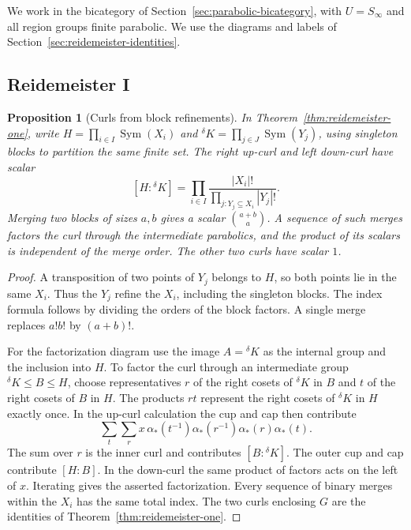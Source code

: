 \documentclass[11pt,a4paper]{article}
\numberwithin{equation}{section}
\newtheorem{proposition}[theorem]{Proposition}
\theoremstyle{definition}
\newcommand{\cg}[2]{{}^{#1}\!#2}
\begin{document}
We work in the bicategory of Section~\ref{sec:parabolic-bicategory},
with \(U=S_\infty\) and all region groups finite parabolic. We use the
diagrams and labels of
Section~\ref{sec:reidemeister-identities}.

\subsection{Reidemeister I}

\begin{proposition}[Curls from block refinements]\label{prop:parabolic-curls}
In Theorem~\ref{thm:reidemeister-one}, write
\(H=\prod_{i\in I}\operatorname{Sym}(X_i)\) and
\(\cg{\delta}{K}=\prod_{j\in J}\operatorname{Sym}(Y_j)\), using
singleton blocks to partition the same finite set. The right up-curl
and left down-curl have scalar
\[
 [H:\cg{\delta}{K}]
 =\prod_{i\in I}\frac{|X_i|!}{\prod_{j:Y_j\subseteq X_i}|Y_j|!}.
\]
Merging two blocks of sizes \(a,b\) gives a scalar
\(\binom{a+b}{a}\). A sequence of such merges factors the curl through
the intermediate parabolics, and the product of its scalars is
independent of the merge order. The other two curls have scalar \(1\).
\end{proposition}

\begin{proof}
A transposition of two points of \(Y_j\) belongs to \(H\), so both
points lie in the same \(X_i\). Thus the \(Y_j\) refine the \(X_i\),
including the singleton blocks.
The index formula follows by dividing the orders of the block
factors. A single merge replaces \(a!b!\) by \((a+b)!\).

For the factorization diagram use the image \(A=\cg{\delta}{K}\)
as the internal group and the inclusion into \(H\).
To factor the curl through an intermediate group
\(\cg{\delta}{K}\le B\le H\), choose representatives \(r\) of the right
cosets of \(\cg{\delta}{K}\) in \(B\) and \(t\) of the right cosets
of \(B\) in \(H\). The products \(rt\) represent the right cosets
of \(\cg{\delta}{K}\) in \(H\) exactly once. In the up-curl calculation
the cup and cap then contribute
\[
 \sum_t\sum_r x\,\alpha_*(t^{-1})\alpha_*(r^{-1})
                    \alpha_*(r)\alpha_*(t).
\]
The sum over \(r\) is the inner curl and contributes
\([B:\cg{\delta}{K}]\). The outer cup and cap contribute \([H:B]\).
In the down-curl the same product of factors acts on the left of \(x\).
Iterating gives the asserted factorization. Every sequence of binary
merges within the \(X_i\) has the same total index. The two curls
enclosing \(G\) are the identities of
Theorem~\ref{thm:reidemeister-one}.
\end{proof}
\end{document}
